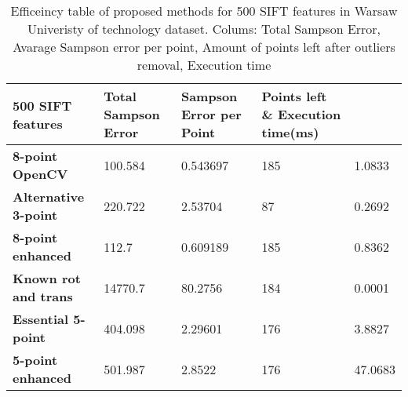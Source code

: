 \begin{table}[h]
\centering
\begin{adjustbox}{width=1\linewidth}
\begin{tabular}{l|l|l|l|l}
\textbf{500 SIFT features}   & \textbf{Total Sampson Error} & \textbf{Sampson Error per Point} & \textbf{Points left} \& \textbf{Execution time(ms)} \\ \hline
\textbf{8-point OpenCV}      & 100.584             & 0.543697                & 185         & 1.0833             \\ \hline
\textbf{Alternative 3-point} & 220.722             & 2.53704                 & 87          & 0.2692             \\ \hline
\textbf{8-point enhanced}    & 112.7               & 0.609189                & 185         & 0.8362             \\ \hline
\textbf{Known rot and trans} & 14770.7             & 80.2756                 & 184         & 0.0001             \\ \hline
\textbf{Essential 5-point}   & 404.098             & 2.29601                 & 176         & 3.8827             \\ \hline
\textbf{5-point enhanced}    & 501.987             & 2.8522                  & 176         & 47.0683            \\
\end{tabular}
\end{adjustbox}
\caption{Efficeincy table of proposed methods for 500 SIFT features in Warsaw Univeristy of technology dataset. Colums: Total Sampson Error, Avarage Sampson error per point, Amount of points left after outliers removal, Execution time}
\label{table:Efficiency500Sift}
\end{table}

